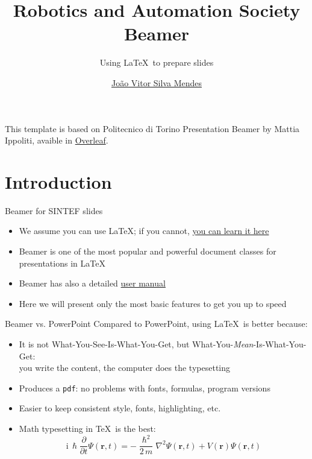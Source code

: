 \documentclass{beamer}
\title{Robotics and Automation Society Beamer}
\subtitle{Using \LaTeX\ to prepare slides}
\author{\href{email:joao.mendes@fbter.org.br}{João Vitor Silva Mendes}}
\newcommand{\hrefcol}[2]{\textcolor{cyan}{\href{#1}{#2}}}
\begin{document}
\maketitle

\begin{frame}

\vspace{\baselineskip}

This template is based on Politecnico di Torino Presentation Beamer by Mattia Ippoliti, avaible in \hrefcol{https://www.overleaf.com/latex/templates/politecnico-di-torino-presentation/cnypkdbdyqky}{Overleaf}.


\end{frame}

\section{Introduction}

\begin{frame}{Beamer for SINTEF slides}
\begin{itemize}
\item We assume you can use \LaTeX; if you cannot,
\hrefcol{http://en.wikibooks.org/wiki/LaTeX/}{you can learn it here}
\item Beamer is one of the most popular and powerful document
classes for presentations in \LaTeX
\item Beamer has also a detailed
\hrefcol{http://www.ctan.org/tex-archive/macros/latex/contrib/beamer/doc/beameruserguide.pdf}{user
 manual}
\item Here we will present only the most basic features to get you up to speed
\end{itemize}
\end{frame}

\begin{frame}{Beamer vs. PowerPoint}
Compared to PowerPoint, using \LaTeX\ is better because:
\begin{itemize}
\item It is not What-You-See-Is-What-You-Get, but
What-You-\emph{Mean}-Is-What-You-Get:\\
you write the content, the computer does the typesetting
\item Produces a \texttt{pdf}: no problems with fonts, formulas,
      program versions
\item Easier to keep consistent style, fonts, highlighting, etc.
\item Math typesetting in \TeX\ is the best:
\begin{equation*}
\mathrm{i}\,\hslash\frac{\partial}{\partial t} \Psi(\mathbf{r},t) =
-\frac{\hslash^2}{2\,m}\nabla^2\Psi(\mathbf{r},t)
+ V(\mathbf{r})\Psi(\mathbf{r},t)
\end{equation*}

\end{itemize}
\end{frame}
\end{document}

